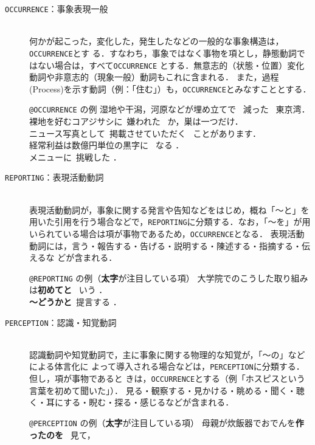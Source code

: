 \documentclass[japanese]{jnlp_1.4}
\newcommand{\modified}[1]{}
\def\event{}
\def\eventc{}
\begin{document}
\begin{description}
\item[{\tt OCCURRENCE}：事象表現一般]\mbox{}\\
何かが起こった，変化した，発生したなどの一般的な事象構造は，{\tt OCCURRENCE}とす
る．すなわち，事象ではなく事物を項とし，静態動詞ではない場合は，すべて{\tt OCCURRENCE}
とする．無意志的（状態・位置）変化動詞や非意志的（現象一般）動詞もこれに含まれる．
また，過程(Process)を示す動詞（例：「住む」）も，{\tt OCCURRENCE}とみなすこととする．

\begin{itembox}[l]{\event\texttt{@OCCURRENCE} の例}
\small
湿地や干潟，河原などが埋め立てで \event\ 減った \eventc\ 東京湾．\\
裸地を好むコアジサシに\event\ 嫌われた \eventc\ か，巣は一つだけ．\\
ニュース写真として\event\ 掲載させていただく \eventc\ ことがあります．\\
経常利益は数億円単位の黒字に \event\ なる \eventc．\\
メニューに\event\ 挑戦した \eventc．
\end{itembox}

\item[{\tt REPORTING}：表現活動動詞]\mbox{}\\
表現活動動詞が，事象に関する発言や告知などをはじめ，概ね「〜と」を用いた引用を行う場合などで，{\tt REPORTING}に分類する．なお，「〜を」が用いられている場合は項が事物であるため，{\tt OCCURRENCE}となる．
表現活動動詞には，言う・報告する・告げる・説明する・陳述する・指摘する・伝えるな
どが含まれる．

\begin{itembox}[l]{\event\texttt{@REPORTING} の例（{\bf 太字}が注目している項）}
\small
大学院でのこうした取り組みは{\bf 初めてと} \event\ いう \eventc．\\
{\bf 〜どうかと}\event\ 提言する \eventc．
\end{itembox}

\item[{\tt PERCEPTION}：認識・知覚動詞]\mbox{}\\
認識動詞や知覚動詞で，主に事象に関する物理的な知覚が，\modified{節や句の}「〜の」などによる体言化に
 よって導入される場合などは，{\tt PERCEPTION}に分類する．但し，項が事物であると
 きは，{\tt OCCURRENCE}とする（例「ホスピスという言葉を初めて聞いた」）．
 見る・観察する・見かける・眺める・聞く・聴く・耳にする・睨む・探る・感じるなどが含まれる．

\begin{itembox}[l]{\event\texttt{@PERCEPTION} の例（{\bf 太字}が注目している項）}
\small 
母親が炊飯器でおでんを{\bf 作ったのを} \event\ 見て\eventc，
\end{itembox}


\end{description}
\end{document}
